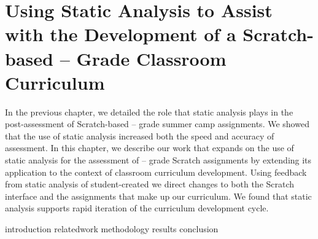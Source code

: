 \chapter{Using Static Analysis to Assist with the Development of a
  Scratch-based -- Grade Classroom Curriculum}
\label{chap:curriculum}

\def\currentprefix{curriculum}

In the previous chapter, we detailed the role that static analysis plays in the
post-assessment of Scratch-based -- grade summer camp
assignments. We showed that the use of static analysis increased both the speed
and accuracy of assessment. In this chapter, we describe our work that expands
on the use of static analysis for the assessment of -- grade
Scratch assignments by extending its application to the context of classroom
curriculum development. Using feedback from static analysis of student-created
 we direct changes to both the Scratch interface and the
assignments that make up our curriculum. We found that static analysis supports
rapid iteration of the curriculum development cycle.

\iffull
{introduction}
{relatedwork}
{methodology}
{results}
{conclusion}
\fi
